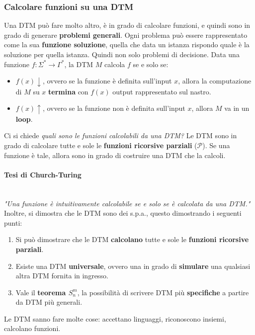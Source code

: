 \documentclass{article}
\begin{document}
\subsubsection{Calcolare funzioni su una DTM}
Una DTM può fare molto altro, è in grado di calcolare funzioni, e quindi
sono in grado di generare \textbf{problemi generali}. Ogni problema può essere
rappresentato come la sua \textbf{funzione soluzione}, quella che data un istanza
rispondo quale è la soluzione per quella istanza. Quindi non solo problemi di decisione.
\newline\newline
Data una funzione $f:\Sigma^*\rightarrow\Gamma^*$, la DTM $M$ calcola $f$ se
e solo se:
\begin{itemize}
    \item $f(x)\downarrow$, ovvero se la funzione è definita sull'input $x$,
          allora la computazione di $M$ su $x$ \textbf{termina} con $f(x)$ output
          rappresentato sul nastro.

    \item $f(x)\uparrow$, ovvero se la funzione non è definita sull'input $x$,
        allora $M$ va in un \textbf{loop}.
\end{itemize}
Ci si chiede \textit{quali sono le funzioni calcolabili da una DTM?} Le DTM
sono in grado di calcolare tutte e sole le \textbf{funzioni ricorsive parziali} ($\mathcal{P}$).
Se una funzione è tale, allora sono in grado di costruire una DTM che la calcoli.

\paragraph{Tesi di Church-Turing}\mbox{}\\
\textit{"Una funzione è intuitivamente calcolabile se e solo se è calcolata da una DTM."}
Inoltre, si dimostra che le DTM sono dei s.p.a., questo dimostrando
i seguenti punti:
\begin{enumerate}
    \item Si può dimostrare che le DTM \textbf{calcolano} tutte e sole le \textbf{funzioni ricorsive parziali}.
    \item Esiste una DTM \textbf{universale}, ovvero una in grado di \textbf{simulare} una qualsiasi altra DTM fornita in ingresso.
    \item Vale il \textbf{teorema $S_n^m$}, la possibilità di scrivere DTM più \textbf{specifiche} a partire da DTM più generali.
\end{enumerate}
Le DTM sanno fare molte cose: accettano linguaggi, riconoscono insiemi,
calcolano funzioni.
\end{document}
